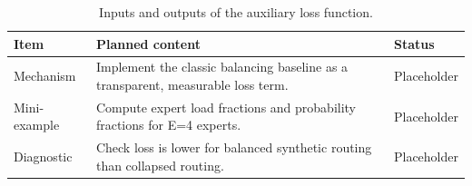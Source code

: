 \begin{table}[H]
\centering
\caption{Inputs and outputs of the auxiliary loss function.}
\label{tab:ch07-auxiliary-load-balancing-loss}
\begin{tabularx}{\textwidth}{p{}X p{}}
\toprule
Item & Planned content & Status \\
\midrule
Mechanism & Implement the classic balancing baseline as a transparent, measurable loss term. & Placeholder \\
Mini-example & Compute expert load fractions and probability fractions for E=4 experts. & Placeholder \\
Diagnostic & Check loss is lower for balanced synthetic routing than collapsed routing. & Placeholder \\
\bottomrule
\end{tabularx}
\end{table}
